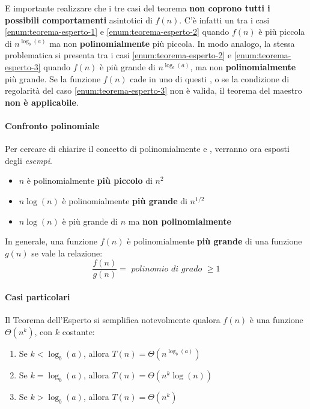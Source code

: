 \documentclass[italian, 10pt]{article}
\begin{document}
\bigskip
E importante realizzare che i tre casi del teorema \textbf{non coprono tutti i possibili comportamenti} asintotici di \(f(n)\).
C'è infatti un  tra i casi \ref{enum:teorema-esperto-1} e \ref{enum:teorema-esperto-2} quando \(f(n)\) è più piccola di \(n^{\log_b(a)}\) ma non \textbf{polinomialmente} più piccola.
In modo analogo, la stessa problematica si presenta tra i casi \ref{enum:teorema-esperto-2} e \ref{enum:teorema-esperto-3} quando \(f(n)\) è più grande di \(n^{\log_b(a)}\), ma non \textbf{polinomialmente} più grande.
Se la funzione \(f(n)\) cade in uno di questi , o se la condizione di regolarità del caso \ref{enum:teorema-esperto-3} non è valida, il teorema del maestro \textbf{non è applicabile}.

\paragraph{Confronto polinomiale}

Per cercare di chiarire il concetto di polinomialmente  e , verranno ora esposti degli \textit{esempi}.

\begin{itemize}
  \item \(n\) è polinomialmente \textbf{più piccolo} di \(n^2\)
  \item \(n \log (n)\) è polinomialmente \textbf{più grande} di \(n^{1/2}\)
  \item \(n \log (n)\) è più grande di \(n\) ma \textbf{non polinomialmente}
\end{itemize}

\bigskip
In generale, una funzione \(f(n)\) è polinomialmente \textbf{più grande} di una funzione \(g(n)\) se vale la relazione:
\[\dfrac{f(n)}{g(n)} = \textit{ polinomio di grado } \geq 1 \]

\paragraph{Casi particolari}

Il Teorema dell'Esperto si semplifica notevolmente qualora \(f(n)\) è una funzione \(\Theta(n^k)\), con \(k\) costante:

\begin{enumerate}[label=\arabic*), ref=(\arabic*)]
  \item\label{enum:caso-particolare-teorema-esperto-1} Se \(k < \log_b(a)\), allora \(T(n) = \Theta\left(n^{\log_b(a)}\right)\)
  \item\label{enum:caso-particolare-teorema-esperto-2} Se \(k = \log_b(a)\), allora \(T(n) = \Theta\left(n^k \log{(n)}\right)\)
  \item\label{enum:caso-particolare-teorema-esperto-3} Se \(k > \log_b(a)\), allora \(T(n) = \Theta\left(n^k\right)\)
\end{enumerate}
\end{document}
